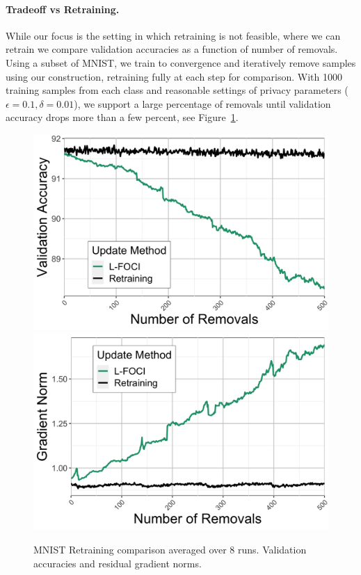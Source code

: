 
\paragraph{Tradeoff vs Retraining.}
While our focus is the setting in which retraining is not feasible, where we can retrain we compare validation accuracies as a function of number of removals. Using a subset of MNIST, we train to convergence and iteratively remove samples using our construction, retraining fully at each step for comparison. With 1000 training samples from each class 
and reasonable settings of privacy parameters ($\epsilon=0.1,\delta=0.01$),
we support a large percentage of removals until validation accuracy drops more than a few percent, see Figure~\ref{fig:retrain}.
\begin{figure}
    \centering
\includegraphics[width=0.49\columnwidth]{5_unlearn/figs/retrain/Retrain_Validation_Accs.png}
\includegraphics[width=0.49\columnwidth]{5_unlearn/figs/retrain/Retrain_Gradient_Norms.png}
    \caption[MNIST retraining comparison]{MNIST Retraining comparison averaged over 8 runs. Validation accuracies and residual gradient norms.}
    \label{fig:retrain}
\end{figure}

